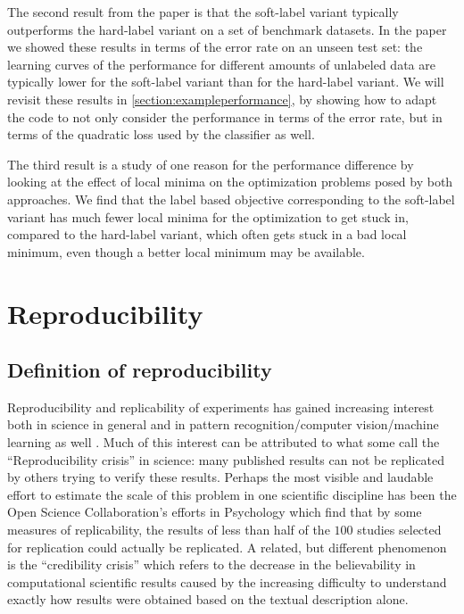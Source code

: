 \documentclass[twoside]{memoir}\usepackage[]{graphicx}\usepackage{xcolor}
\renewcommand{\cite}{\citep}
\begin{document}
The second result from the paper \cite{Krijthe2016a} is that the soft-label variant typically outperforms the hard-label variant on a set of benchmark datasets. In the paper we showed these results in terms of the error rate on an unseen test set: the learning curves of the performance for different amounts of unlabeled data are typically lower for the soft-label variant than for the hard-label variant. We will revisit these results in \cref{section:exampleperformance}, by showing how to adapt the code to not only consider the performance in terms of the error rate, but in terms of the quadratic loss used by the classifier as well.

The third result is a study of one reason for the performance difference by looking at the effect of local minima on the optimization problems posed by both approaches. We find that the label based objective corresponding to the soft-label variant has much fewer local minima for the optimization to get stuck in, compared to the hard-label variant, which often gets stuck in a bad local minimum, even though a better local minimum may be available.

\section{Reproducibility}

\subsection{Definition of reproducibility}
Reproducibility and replicability of experiments has gained increasing interest both in science in general \citep{Goodman2016a} and in pattern recognition/computer vision/machine learning as well \citep{Drummond2009,Donoho2009}. Much of this interest can be attributed to what some call the ``Reproducibility crisis'' in science: many published results can not be replicated by others trying to verify these results. Perhaps the most visible and laudable effort to estimate the scale of this problem in one scientific discipline has been the Open Science Collaboration's efforts in Psychology \citep{OpenScienceCollaboration2015} which find that by some measures of replicability, the results of less than half of the $100$ studies selected for replication could actually be replicated. A related, but different phenomenon is the ``credibility crisis'' \citep{Donoho2009} which refers to the decrease in the believability in computational scientific results caused by the increasing difficulty to understand exactly how results were obtained based on the textual description alone.
\end{document}
